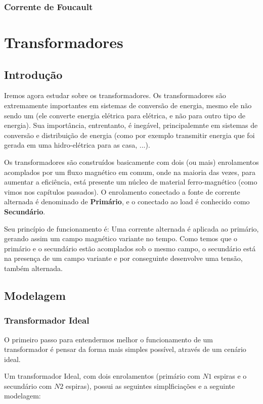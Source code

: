 \documentclass{article}
\begin{document}
\subsubsection{Corrente de Foucault}

\newpage
\section{Transformadores}
\subsection{Introdução}
Iremos agora estudar sobre os transformadores. Os transformadores são extremamente importantes em sistemas de conversão de energia, mesmo ele não sendo um (ele converte energia elétrica para elétrica, e não para outro tipo de energia).  Sua importância, entrentanto, é inegável, principalemnte em sistemas de conversão e distribuição de energia (como por exemplo transmitir energia que foi gerada em uma hidro-elétrica para as casa, ...).

Os transformadores são construídos basicamente com dois (ou mais) enrolamentos acomplados por um fluxo magnético em comum, onde na maioria das vezes, para aumentar a eficiência, está presente um núcleo de material ferro-magnético (como vimos nos capítulos passados). O enrolamento conectado a fonte de corrente alternada é denominado de \textbf{Primário}, e o conectado ao load é conhecido como \textbf{Secundário}. 

Seu princípio de funcionamento é:  Uma corrente alternada é aplicada ao primário, gerando assim um campo magnético variante no tempo. Como temos que o primário e o secundário estão acomplados sob o mesmo campo, o secundário está na presença de um campo variante e por conseguinte desenvolve uma tensão, também alternada.

\subsection{Modelagem}
\subsubsection{Transformador Ideal}
O primeiro passo para entendermos melhor o funcionamento de um transformador é pensar da forma mais simples possível, através de um cenário ideal. 

Um transformador Ideal, com dois enrolamentos (primário com $N1$ espiras e o secundário com $N2$ espiras), possui as seguintes simplficiações e a seguinte modelagem:
\end{document}
